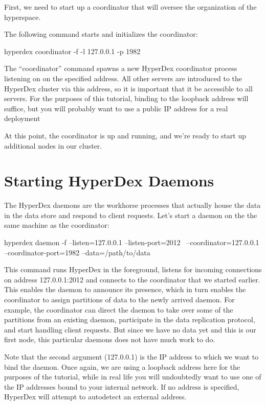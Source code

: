 First, we need to start up a coordinator that will oversee the organization of
the hyperspace.

The following command starts and initializes the coordinator:

\begin{consolecode}
hyperdex coordinator -f -l 127.0.0.1 -p 1982
\end{consolecode}

The ``coordinator'' command spawns a new HyperDex coordinator process listening
on on the specified address.  All other servers are introduced to the HyperDex
cluster via this address, so it is important that it be accessible to all
servers.  For the purposes of this tutorial, binding to the loopback address
will suffice, but you will probably want to use a public IP address for a real
deployment

At this point, the coordinator is up and running, and we're ready to start up
additional nodes in our cluster.

\section{Starting HyperDex Daemons}

The HyperDex daemons are the workhorse processes that actually house the data in
the data store and respond to client requests. Let's start a daemon on the the
same machine as the coordinator:

\begin{consolecode}
hyperdex daemon -f --listen=127.0.0.1 --listen-port=2012 \
                   --coordinator=127.0.0.1 --coordinator-port=1982 --data=/path/to/data
\end{consolecode}

This command runs HyperDex in the foreground, listens for incoming connections
on address 127.0.0.1:2012 and connects to the coordinator that we started
earlier.  This enables the daemon to announce its presence, which in turn
enables the coordinator to assign partitions of data to the newly arrived
daemon.  For example, the coordinator can direct the daemon to take over some of
the partitions from an existing daemon, participate in the data replication
protocol, and start handling client requests.  But since we have no data yet and
this is our first node, this particular daemons does not have much work to do.

Note that the second argument (127.0.0.1) is the IP address to which we want to
bind the daemon.  Once again, we are using a loopback address here for the
purposes of the tutorial, while in real life you will undoubtedly want to use
one of the IP addresses bound to your internal network.  If no address is
specified, HyperDex will attempt to autodetect an external address.

